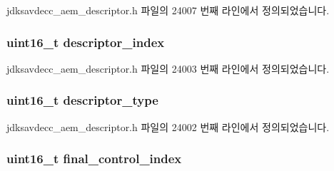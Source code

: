 jdksavdecc\+\_\+aem\+\_\+descriptor.\+h 파일의 24007 번째 라인에서 정의되었습니다.

\subsubsection[{\texorpdfstring{descriptor\+\_\+index}{descriptor_index}}]{\setlength{\rightskip}{0pt plus 5cm}uint16\+\_\+t descriptor\+\_\+index}\hypertarget{structjdksavdecc__descriptor__control__block_a042bbc76d835b82d27c1932431ee38d4}{}\label{structjdksavdecc__descriptor__control__block_a042bbc76d835b82d27c1932431ee38d4}


jdksavdecc\+\_\+aem\+\_\+descriptor.\+h 파일의 24003 번째 라인에서 정의되었습니다.

\subsubsection[{\texorpdfstring{descriptor\+\_\+type}{descriptor_type}}]{\setlength{\rightskip}{0pt plus 5cm}uint16\+\_\+t descriptor\+\_\+type}\hypertarget{structjdksavdecc__descriptor__control__block_ab7c32b6c7131c13d4ea3b7ee2f09b78d}{}\label{structjdksavdecc__descriptor__control__block_ab7c32b6c7131c13d4ea3b7ee2f09b78d}


jdksavdecc\+\_\+aem\+\_\+descriptor.\+h 파일의 24002 번째 라인에서 정의되었습니다.

\subsubsection[{\texorpdfstring{final\+\_\+control\+\_\+index}{final_control_index}}]{\setlength{\rightskip}{0pt plus 5cm}uint16\+\_\+t final\+\_\+control\+\_\+index}\hypertarget{structjdksavdecc__descriptor__control__block_a6853bf58b4f94780a8c4b05bbaad059a}{}\label{structjdksavdecc__descriptor__control__block_a6853bf58b4f94780a8c4b05bbaad059a}


